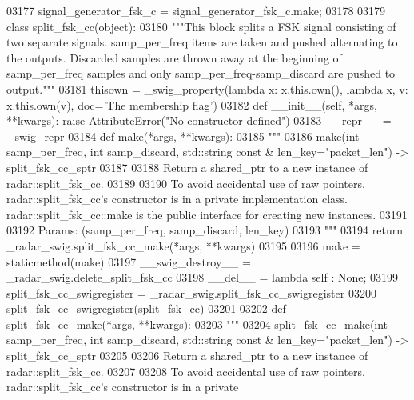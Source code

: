 \begin{DoxyCode}
{{{{{{{{{{{{03177 signal\_generator\_fsk\_c = signal\_generator\_fsk\_c.make;
03178 
03179 \textcolor{keyword}{class }split_fsk_cc(object):
03180     \textcolor{stringliteral}{"""This block splits a FSK signal consisting of two separate signals. samp\_per\_freq items are taken and
       pushed alternating to the outputs. Discarded samples are thrown away at the beginning of samp\_per\_freq
       samples and only samp\_per\_freq-samp\_discard are pushed to output."""}
03181     thisown = _swig_property(\textcolor{keyword}{lambda} x: x.this.own(), \textcolor{keyword}{lambda} x, v: x.this.own(v), doc=\textcolor{stringliteral}{'The membership flag'})
03182     \textcolor{keyword}{def }__init__(self, *args, **kwargs): \textcolor{keywordflow}{raise} AttributeError(\textcolor{stringliteral}{"No constructor defined"})
03183     \_\_repr\_\_ = \_swig\_repr
03184     \textcolor{keyword}{def }make(*args, **kwargs):
03185         \textcolor{stringliteral}{"""}
03186 \textcolor{stringliteral}{        make(int samp\_per\_freq, int samp\_discard, std::string const & len\_key="packet\_len") ->
       split\_fsk\_cc\_sptr}
03187 \textcolor{stringliteral}{}
03188 \textcolor{stringliteral}{        Return a shared\_ptr to a new instance of radar::split\_fsk\_cc.}
03189 \textcolor{stringliteral}{}
03190 \textcolor{stringliteral}{        To avoid accidental use of raw pointers, radar::split\_fsk\_cc's constructor is in a private
       implementation class. radar::split\_fsk\_cc::make is the public interface for creating new instances.}
03191 \textcolor{stringliteral}{}
03192 \textcolor{stringliteral}{        Params: (samp\_per\_freq, samp\_discard, len\_key)}
03193 \textcolor{stringliteral}{        """}
03194         \textcolor{keywordflow}{return} \_radar\_swig.split\_fsk\_cc\_make(*args, **kwargs)
03195 
03196     make = staticmethod(make)
03197     \_\_swig\_destroy\_\_ = \_radar\_swig.delete\_split\_fsk\_cc
03198     \_\_del\_\_ = \textcolor{keyword}{lambda} self : \textcolor{keywordtype}{None};
03199 split\_fsk\_cc\_swigregister = \_radar\_swig.split\_fsk\_cc\_swigregister
03200 split_fsk_cc_swigregister(split\_fsk\_cc)
03201 
03202 \textcolor{keyword}{def }split_fsk_cc_make(*args, **kwargs):
03203   \textcolor{stringliteral}{"""}
03204 \textcolor{stringliteral}{    split\_fsk\_cc\_make(int samp\_per\_freq, int samp\_discard, std::string const & len\_key="packet\_len") ->
       split\_fsk\_cc\_sptr}
03205 \textcolor{stringliteral}{}
03206 \textcolor{stringliteral}{    Return a shared\_ptr to a new instance of radar::split\_fsk\_cc.}
03207 \textcolor{stringliteral}{}
03208 \textcolor{stringliteral}{    To avoid accidental use of raw pointers, radar::split\_fsk\_cc's constructor is in a private
}}}}}}}}}}}}}
\end{DoxyCode}
